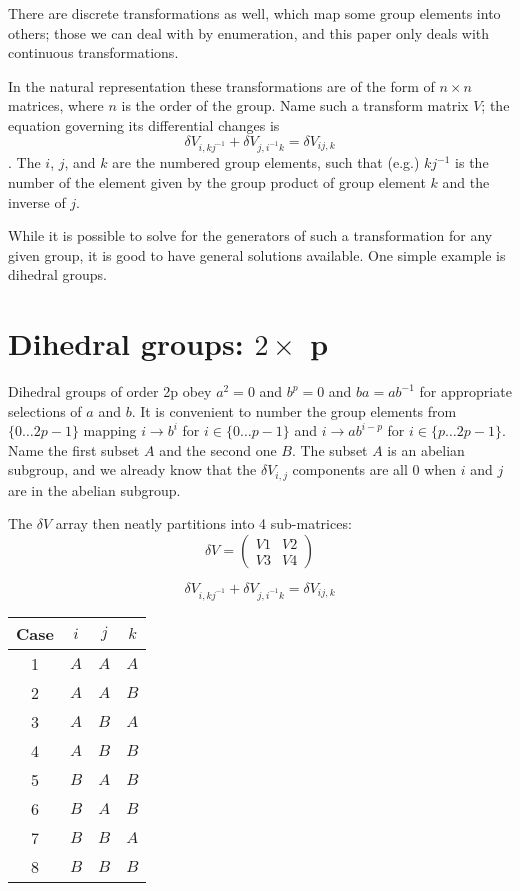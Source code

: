 \documentclass{revtex4-1}
\begin{document}
\par There are discrete transformations as well, which map some group elements into others; those 
we can deal with by enumeration, and this paper only deals with continuous transformations.


\par In the natural representation these transformations are of the form of $n \times n$ matrices, where $n$ is the
order of the group.  Name such a transform matrix $V$; the equation governing its differential
changes is $$\delta V_{i,kj^{-1}} + \delta V_{j,i^{-1}k} = \delta V_{ij,k}$$.  The $i$, $j$, and $k$ are the numbered group elements, 
such that (e.g.) $kj^{-1}$ is the number of the element given by the group product of group element $k$ and the inverse of $j$.

\par While it is possible to solve for the generators of such a transformation for any given
group, it is good to have general solutions available.  One simple example is dihedral groups.

\section{Dihedral groups:  $2 \times$ p}
Dihedral groups of order 2p obey $a^2=0$ and $b^p=0$
and $ba=ab^{-1}$ for appropriate selections of $a$ and $b$.  It is convenient
to number the group elements from $\{0\dots 2p-1\}$ mapping $i \rightarrow b^i$ for 
$i \in \{0\dots p-1\}$ and $i \rightarrow ab^{i-p}$ for $i \in \{p\dots 2p-1\}$.
Name the first subset $A$ and the second one $B$.   The subset $A$ is an abelian subgroup,
and we already know that the $\delta V_{i,j}$ components are all $0$ when $i$ and $j$ are
in the abelian subgroup.

\par The $\delta V$ array then neatly partitions into 4 sub-matrices:
\begin{equation}
\delta V = \left(\begin{array}{cc} V1 & V2 \\ V3 & V4
\end{array}\right)
\end{equation}

$$\delta V_{i,kj^{-1}} + \delta V_{j,i^{-1}k} = \delta V_{ij,k}$$

\begin{center}
\begin{tabular}{c|ccc}
Case & $i$ & $j$ & $k$ \\ \hline
1 & $A$ & $A$ & $A$ \\
2 & $A$ & $A$ & $B$ \\
3 & $A$ & $B$ & $A$ \\
4 & $A$ & $B$ & $B$ \\
5 & $B$ & $A$ & $B$ \\
6 & $B$ & $A$ & $B$ \\
7 & $B$ & $B$ & $A$ \\
8 & $B$ & $B$ & $B$ 
\end{tabular}
\end{center}
\end{document}
